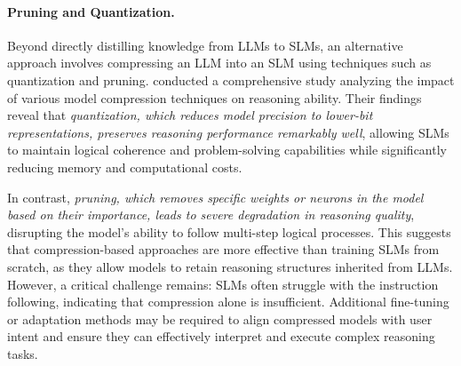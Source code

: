 \paragraph{\textbf{Pruning and Quantization.}}
Beyond directly distilling knowledge from LLMs to SLMs, an alternative approach involves compressing an LLM into an SLM using techniques such as quantization and pruning. \cite{srivastava2025towards} conducted a comprehensive study analyzing the impact of various model compression techniques on reasoning ability. Their findings reveal that \textit{quantization, which reduces model precision to lower-bit representations, preserves reasoning performance remarkably well}, allowing SLMs to maintain logical coherence and problem-solving capabilities while significantly reducing memory and computational costs. 

In contrast, \textit{pruning, which removes specific weights or neurons in the model based on their importance, leads to severe degradation in reasoning quality}, disrupting the model's ability to follow multi-step logical processes. This suggests that compression-based approaches are more effective than training SLMs from scratch, as they allow models to retain reasoning structures inherited from LLMs. However, a critical challenge remains: SLMs often struggle with the instruction following, indicating that compression alone is insufficient. Additional fine-tuning or adaptation methods may be required to align compressed models with user intent and ensure they can effectively interpret and execute complex reasoning tasks.

